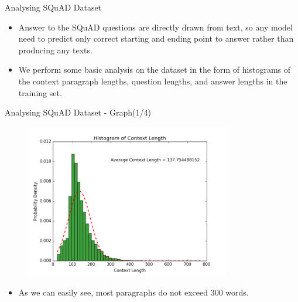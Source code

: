 \documentclass[10pt]{beamer}
\begin{document}
\begin{frame}[fragile]{Analysing SQuAD Dataset}

	\begin{itemize}[<+- | alert@+>]
		\item Answer to the SQuAD questions are directly drawn from text, so any model need to predict only correct starting and ending point to answer rather than producing any texts.
		\item We perform some basic analysis on the dataset in the form of histograms
			of the context paragraph lengths,  question lengths,  and answer lengths in the training set.
	\end{itemize}
\end{frame}

\begin{frame}[fragile]{Analysing SQuAD Dataset - Graph(1/4)}

	\begin{figure}[H]
		\centering
		{\includegraphics[width=0.8\textwidth]{includes/context_hist_fin.png}\label{fig:f1}}
	\end{figure}

	\begin{itemize}
		\item As we can easily see, most paragraphs do not exceed 300 words.
	\end{itemize}
\end{frame}
\end{document}
